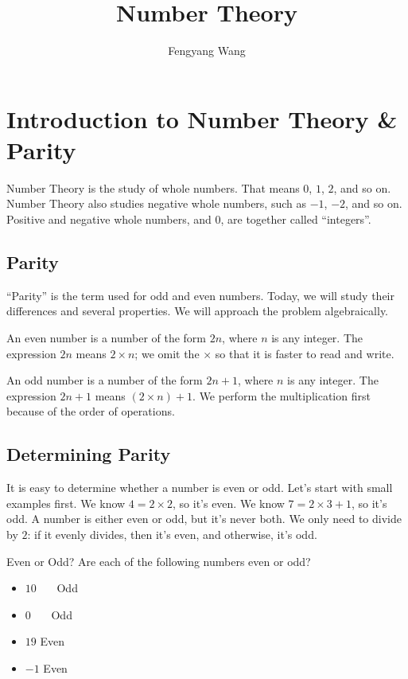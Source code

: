 \documentclass[a4paper,10pt]{report}
\title{Number Theory}
\author{Fengyang Wang}
\begin{document}
\maketitle

\chapter{Introduction to Number Theory \& Parity}

Number Theory is the study of whole numbers. That means $0$, $1$, $2$, and so
on. Number Theory also studies negative whole numbers, such as $-1$, $-2$, and
so on. Positive and negative whole numbers, and $0$, are together called
``integers''.

\section{Parity}

``Parity'' is the term used for odd and even numbers. Today, we will study their
differences and several properties. We will approach the problem algebraically.

An even number is a number of the form $2n$, where $n$ is any integer. The
expression $2n$ means $2\times n$; we omit the $\times$ so that it is faster to
read and write.

An odd number is a number of the form $2n+1$, where $n$ is any integer. The
expression $2n+1$ means $(2\times n) + 1$. We perform the multiplication first
because of the order of operations.

\section{Determining Parity}
It is easy to determine whether a number is even or odd. Let's start with small
examples first. We know $4=2\times2$, so it's even. We know $7=2\times3+1$, so
it's odd. A number is either even or odd, but it's never both. We only need to
divide by $2$: if it evenly divides, then it's even, and otherwise, it's odd.

\begin{problem}{Even or Odd?}
 Are each of the following numbers even or odd?

 \begin{itemize}
  \item $10$ \hfill {}~~~Odd
  \item $0$ \hfill {}~~~Odd
  \item $19$ \hfill Even~~~
  \item $-1$ \hfill Even~~~
 \end{itemize}
\end{problem}
\end{document}
